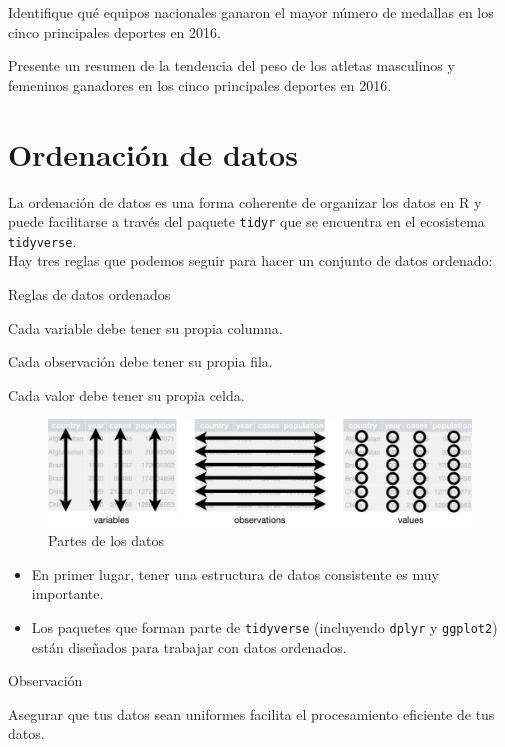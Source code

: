 \documentclass[
]{book}
\providecommand{\tightlist}{%
  \setlength{\itemsep}{0pt}\setlength{\parskip}{0pt}}
\begin{document}
Identifique qué equipos nacionales ganaron el mayor número de medallas en los cinco principales deportes en 2016.

Presente un resumen de la tendencia del peso de los atletas masculinos y femeninos ganadores en los cinco principales deportes en 2016.

\section{Ordenación de datos}\label{ordenaciuxf3n-de-datos}

La ordenación de datos es una forma coherente de organizar los datos en R y puede facilitarse a través del paquete \texttt{tidyr} que se encuentra en el ecosistema \texttt{tidyverse}.\\
Hay tres reglas que podemos seguir para hacer un conjunto de datos ordenado:

{} Reglas de datos ordenados

Cada variable debe tener su propia columna.

Cada observación debe tener su propia fila.

Cada valor debe tener su propia celda.

\begin{figure}

{\centering \includegraphics[width=1\linewidth]{images/figura1} 

}

\caption{Partes de los datos}\label{fig:figura1}
\end{figure}

\begin{itemize}
\tightlist
\item
  En primer lugar, tener una estructura de datos consistente es muy importante.\\
\item
  Los paquetes que forman parte de \texttt{tidyverse} (incluyendo \texttt{dplyr} y \texttt{ggplot2}) están diseñados para trabajar con datos ordenados.
\end{itemize}

{} Observación

Asegurar que tus datos sean uniformes facilita el procesamiento eficiente de tus datos.
\end{document}
